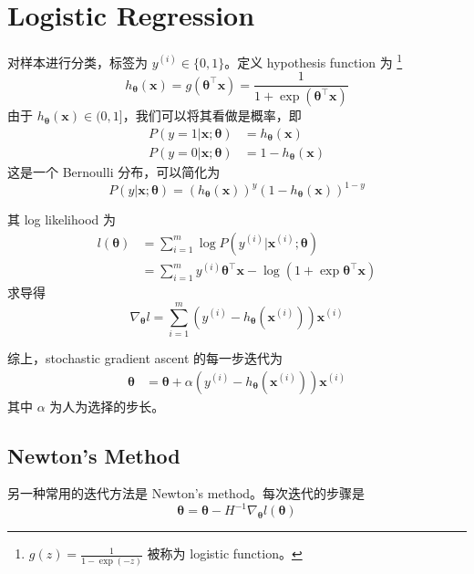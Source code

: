 \chapter{Logistic Regression}
	对样本进行分类，标签为 $ y^{(i)} \in \{0, 1\} $。定义 hypothesis function 为
	\footnote{$ g(z) = \frac{1}{1- \exp(-z)} $ 被称为 logistic function。}
	\begin{equation}
		h_{\bm\theta}(\bm{x}) = g(\bm{\theta}^\intercal \bm{x}) = \frac{1}{1 + \exp{({\bm{\theta}}^\intercal \bm{x})}}
	\end{equation}
	由于 $ h_{\bm{\theta}}(\bm{x}) \in (0, 1] $，我们可以将其看做是概率，即
	\begin{align*}
		P(y=1 | \bm{x}; \bm{\theta}) &= h_{\bm{\theta}}(\bm{x}) \\
		P(y=0 | \bm{x}; \bm{\theta}) &= 1 - h_{\bm{\theta}}(\bm{x})
	\end{align*}
	这是一个 Bernoulli 分布，可以简化为 
	\begin{equation}
		P(y | \bm{x}; \bm{\theta}) = (h_{\bm{\theta}}(\bm{x}))^y (1 - h_{\bm{\theta}}(\bm{x}))^{1-y}
	\end{equation}
	
	其 log likelihood 为
	\begin{align*}
		l(\bm{\theta}) &= \sum_{i=1}^{m} \log P(y^{(i)} | \bm{x}^{(i)}; \bm{\theta}) \\
		&= \sum_{i=1}^{m} y^{(i)} \bm{\theta}^\intercal \bm{x} - \log(1+\exp \bm{\theta}^\intercal \bm{x}) 
	\end{align*}
	求导得
	\begin{equation}
		\nabla_{\bm{\theta}} l = \sum_{i=1}^{m} (y^{(i)} - h_{\bm{\theta}}(\bm{x}^{(i)})) \bm{x}^{(i)}
	\end{equation}
	
	综上，stochastic gradient ascent 的每一步迭代为 
	\begin{align*}
		\bm{\theta} &= \bm{\theta} + \alpha (y^{(i)} - h_{\bm{\theta}}(\bm{x}^{(i)})) \bm{x}^{(i)}
	\end{align*}
	其中 $ \alpha $ 为人为选择的步长。
	
	\section{Newton's Method}
		另一种常用的迭代方法是 Newton's method。每次迭代的步骤是
		\begin{equation}
			\bm{\theta} = \bm{\theta} - H^{-1} \nabla_{\bm{\theta}} l(\bm{\theta})
		\end{equation}